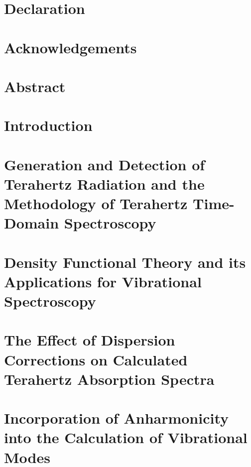 \documentclass[oneside, 12pt]{report}
\numberwithin{equation}{section}
\begin{document}
\setlength{\parskip}{5pt}



\chapter*{Declaration}

\clearpage


\chapter*{Acknowledgements}


\chapter*{Abstract}


\tableofcontents

\listoffigures
\listoftables

\printglossary[type=\acronymtype, nonumberlist, nopostdot]

\chapter{Introduction}
\label{ch:int}


\chapter{Generation and Detection of Terahertz Radiation and the Methodology of Terahertz Time-Domain Spectroscopy}
\label{ch:exp_theory}


\chapter{Density Functional Theory and its Applications for Vibrational Spectroscopy}
\label{ch:dft_theory}


\chapter{The Effect of Dispersion Corrections on Calculated Terahertz Absorption Spectra}
\label{ch:ivdw}


\chapter{Incorporation of Anharmonicity into the Calculation of Vibrational Modes}
\label{ch:qha}

\end{document}
